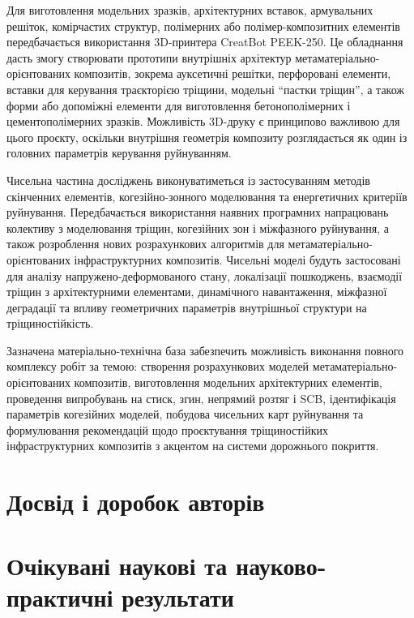 \documentclass[12pt,a4paper]{article}
\begin{document}
Для виготовлення модельних зразків, архітектурних вставок, армувальних решіток, комірчастих структур, полімерних або полімер-композитних елементів передбачається використання 3D-принтера CreatBot PEEK-250. Це обладнання дасть змогу створювати прототипи внутрішніх архітектур метаматеріально-орієнтованих композитів, зокрема ауксетичні решітки, перфоровані елементи, вставки для керування траєкторією тріщини, модельні ``пастки тріщин'', а також форми або допоміжні елементи для виготовлення бетонополімерних і цементополімерних зразків. Можливість 3D-друку є принципово важливою для цього проєкту, оскільки внутрішня геометрія композиту розглядається як один із головних параметрів керування руйнуванням.

Чисельна частина досліджень виконуватиметься із застосуванням методів скінченних елементів, когезійно-зонного моделювання та енергетичних критеріїв руйнування. Передбачається використання наявних програмних напрацювань колективу з моделювання тріщин, когезійних зон і міжфазного руйнування, а також розроблення нових розрахункових алгоритмів для метаматеріально-орієнтованих інфраструктурних композитів. Чисельні моделі будуть застосовані для аналізу напружено-деформованого стану, локалізації пошкоджень, взаємодії тріщин з архітектурними елементами, динамічного навантаження, міжфазної деградації та впливу геометричних параметрів внутрішньої структури на тріщиностійкість.

Зазначена матеріально-технічна база забезпечить можливість виконання повного комплексу робіт за темою: створення розрахункових моделей метаматеріально-орієнтованих композитів, виготовлення модельних архітектурних елементів, проведення випробувань на стиск, згин, непрямий розтяг і SCB, ідентифікація параметрів когезійних моделей, побудова чисельних карт руйнування та формулювання рекомендацій щодо проєктування тріщиностійких інфраструктурних композитів з акцентом на системи дорожнього покриття.


\section{Досвід і доробок авторів}

\section{Очікувані наукові та науково-практичні результати}
\end{document}
